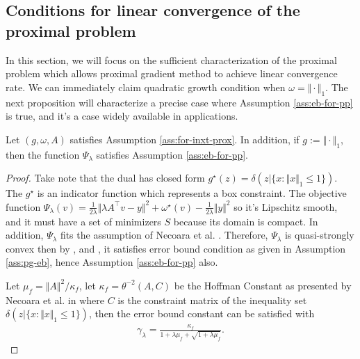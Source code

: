 \documentclass[12pt]{article}
\begin{document}
    \subsection{Conditions for linear convergence of the proximal problem}
        In this section, we will focus on the sufficient characterization of the proximal problem which allows proximal gradient method to achieve linear convergence rate. 
        We can immediately claim quadratic growth condition when $\omega = \Vert \cdot\Vert_1$. 
        The next proposition will characterize a precise case where Assumption \ref{ass:eb-for-pp} is true, and it's a case widely available in applications. 
        \begin{proposition}\label{prop:1nrm-prox-problem}
            Let $(g, \omega, A)$ satisfies Assumption \ref{ass:for-inxt-prox}. 
            In addition, if $g := \Vert \cdot\Vert_1$, then the function $\Psi_\lambda$ satisfies Assumption \ref{ass:eb-for-pp}. 
        \end{proposition}
        \begin{proof}
            Take note that the dual has closed form $g^\star(z) =\delta(z | \{x : \Vert x\Vert_1 \le 1\})$. 
            The $g^\star$ is an indicator function which represents a box constraint. 
            The objective function $\Psi_\lambda(v) = \frac{1}{2\lambda}\Vert \lambda A^\top v - y\Vert^2 + \omega^\star(v) - \frac{1}{2\lambda}\Vert y\Vert^2$ so it's Lipschitz smooth, and it must have a set of minimizers $S$ because its domain is compact. 
            In addition, $\Psi_\lambda$ fits the assumption of Necoara et al. \cite[Theorem 8]{necoara_linear_2019}. 
            Therefore, $\Psi_\lambda$ is quasi-strongly convex then by \cite[Theorem 4]{necoara_linear_2019}, and \cite[Theorem 7]{necoara_linear_2019}, it satisfies error bound condition as given in Assumption \ref{ass:pg-eb}, hence Assumption \ref{ass:eb-for-pp} also. 
            \par
            Let $\mu_f = \Vert A\Vert^2/\kappa_f$, let $\kappa_f = \theta^{-2}(A, C)$ be the Hoffman Constant as presented by Necoara et al. in \cite[Section 4]{necoara_linear_2019} where $C$ is the constraint matrix of the inequality set $\delta(z | \{x : \Vert x\Vert_1 \le 1\})$, then the error bound constant can be satisfied with
            \begin{align*}
                \gamma_\lambda = \frac{\kappa_f}{1 + \lambda\mu_f + \sqrt{1 + \lambda\mu_f}}. 
            \end{align*}
        \end{proof}
\end{document}
